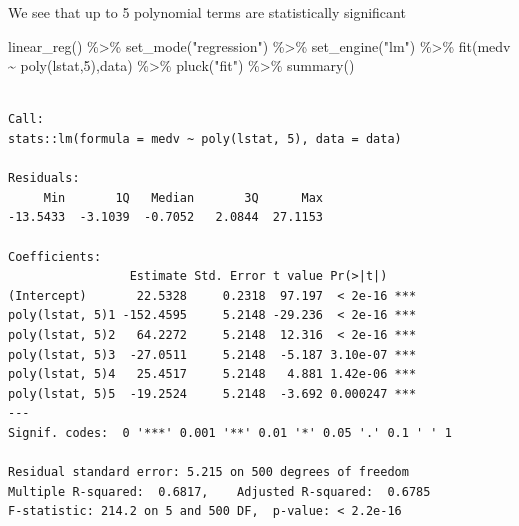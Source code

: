 \documentclass[
  letterpaper,
  DIV=11,
  numbers=noendperiod]{scrreprt}
\newenvironment{Shaded}{\begin{snugshade}}{\end{snugshade}}
\newcommand{\DecValTok}[1]{\textcolor[rgb]{0.47,0.16,0.63}{#1}}
\newcommand{\FunctionTok}[1]{\textcolor[rgb]{0.02,0.16,0.49}{#1}}
\newcommand{\NormalTok}[1]{\textcolor[rgb]{0.33,0.33,0.33}{#1}}
\newcommand{\SpecialCharTok}[1]{\textcolor[rgb]{0.00,0.46,0.62}{#1}}
\newcommand{\StringTok}[1]{\textcolor[rgb]{0.00,0.50,0.00}{#1}}
\begin{document}
We see that up to 5 polynomial terms are statistically significant

\begin{Shaded}
\begin{Highlighting}[]
\FunctionTok{linear\_reg}\NormalTok{() }\SpecialCharTok{\%\textgreater{}\%} 
  \FunctionTok{set\_mode}\NormalTok{(}\StringTok{"regression"}\NormalTok{) }\SpecialCharTok{\%\textgreater{}\%} 
  \FunctionTok{set\_engine}\NormalTok{(}\StringTok{"lm"}\NormalTok{) }\SpecialCharTok{\%\textgreater{}\%} 
  \FunctionTok{fit}\NormalTok{(medv }\SpecialCharTok{\textasciitilde{}} \FunctionTok{poly}\NormalTok{(lstat,}\DecValTok{5}\NormalTok{),data) }\SpecialCharTok{\%\textgreater{}\%} 
  \FunctionTok{pluck}\NormalTok{(}\StringTok{"fit"}\NormalTok{) }\SpecialCharTok{\%\textgreater{}\%} 
  \FunctionTok{summary}\NormalTok{()}
\end{Highlighting}
\end{Shaded}

\begin{verbatim}

Call:
stats::lm(formula = medv ~ poly(lstat, 5), data = data)

Residuals:
     Min       1Q   Median       3Q      Max 
-13.5433  -3.1039  -0.7052   2.0844  27.1153 

Coefficients:
                 Estimate Std. Error t value Pr(>|t|)    
(Intercept)       22.5328     0.2318  97.197  < 2e-16 ***
poly(lstat, 5)1 -152.4595     5.2148 -29.236  < 2e-16 ***
poly(lstat, 5)2   64.2272     5.2148  12.316  < 2e-16 ***
poly(lstat, 5)3  -27.0511     5.2148  -5.187 3.10e-07 ***
poly(lstat, 5)4   25.4517     5.2148   4.881 1.42e-06 ***
poly(lstat, 5)5  -19.2524     5.2148  -3.692 0.000247 ***
---
Signif. codes:  0 '***' 0.001 '**' 0.01 '*' 0.05 '.' 0.1 ' ' 1

Residual standard error: 5.215 on 500 degrees of freedom
Multiple R-squared:  0.6817,    Adjusted R-squared:  0.6785 
F-statistic: 214.2 on 5 and 500 DF,  p-value: < 2.2e-16
\end{verbatim}
\end{document}
